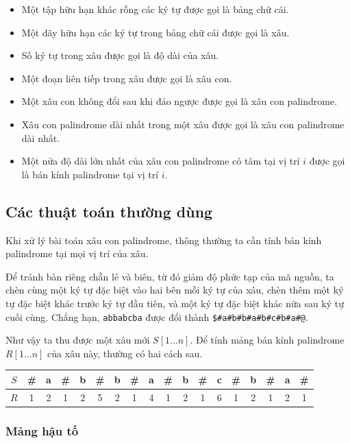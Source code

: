 \documentclass[11pt]{article}
\begin{document}
\begin{itemize}
  \item Một tập hữu hạn khác rỗng các ký tự được gọi là bảng chữ cái.
  \item Một dãy hữu hạn các ký tự trong bảng chữ cái được gọi là xâu.
  \item Số ký tự trong xâu được gọi là độ dài của xâu.
  \item Một đoạn liên tiếp trong xâu được gọi là xâu con.
  \item Một xâu con không đổi sau khi đảo ngược được gọi là xâu con palindrome.
  \item Xâu con palindrome dài nhất trong một xâu được gọi là xâu con
  palindrome dài nhất.
  \item Một nửa độ dài lớn nhất của xâu con palindrome có tâm tại vị trí \(i\)
  được gọi là bán kính palindrome tại vị trí \(i\).
\end{itemize}

\subsection{Các thuật toán thường dùng}

Khi xử lý bài toán xâu con palindrome, thông thường ta cần tính bán kính
palindrome tại mọi vị trí của xâu.

Để tránh bàn riêng chẵn lẻ và biên, từ đó giảm độ phức tạp của mã nguồn, ta
chèn cùng một ký tự đặc biệt vào hai bên mỗi ký tự của xâu, chèn thêm một ký tự
đặc biệt khác trước ký tự đầu tiên, và một ký tự đặc biệt khác nữa sau ký tự
cuối cùng. Chẳng hạn, \texttt{abbabcba} được đổi thành
\texttt{\$\#a\#b\#b\#a\#b\#c\#b\#a\#@}.

Như vậy ta thu được một xâu mới \(S[1\ldots n]\). Để tính mảng bán kính
palindrome \(R[1\ldots n]\) của xâu này, thường có hai cách sau.

\begin{center}
\begin{tabular}{c|ccccccccccccccccc}
\(S\) & \# & a & \# & b & \# & b & \# & a & \# & b & \# & c & \# & b & \# & a & \# \\
\hline
\(R\) & 1 & 2 & 1 & 2 & 5 & 2 & 1 & 4 & 1 & 2 & 1 & 6 & 1 & 2 & 1 & 2 & 1
\end{tabular}
\end{center}

\subsubsection{Mảng hậu tố}
\end{document}
